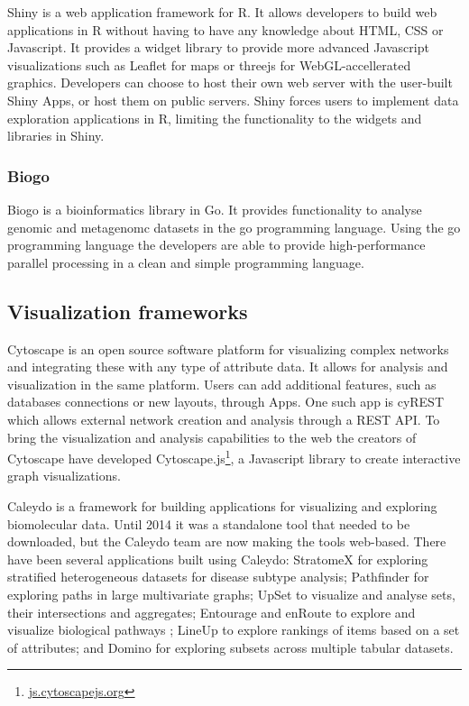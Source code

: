 Shiny is a web application framework for R.\cite{shiny} It allows developers to
build web applications in R without having to have any knowledge about HTML, CSS
or Javascript. It provides a widget library to provide more advanced Javascript
visualizations such as Leaflet for maps or threejs for WebGL-accellerated
graphics. Developers can choose to host their own web server with the user-built
Shiny Apps, or host them on public servers. Shiny forces users to implement data
exploration applications in R, limiting the functionality to the 
widgets and libraries in Shiny. 


\subsubsection*{Biogo} 
Biogo is a bioinformatics library in Go. It provides functionality to analyse
genomic and metagenomc datasets in the go programming
language.\cite{Kortschak005033} Using the go programming language the developers
are able to provide high-performance parallel processing in a clean and simple
programming language. 

\subsection*{Visualization frameworks} 
Cytoscape is an open source software platform for visualizing complex
networks and integrating these with any type of attribute
data\cite{shannon2003cytoscape}. It allows for analysis and visualization in the
same platform. Users can add additional features, such as databases connections
or new layouts, through Apps. One such app is cyREST which allows external network
creation and analysis through a REST API\cite{ono2015cyrest}.
To bring the visualization and analysis
capabilities to the web the creators of Cytoscape have developed
Cytoscape.js\footnote{\url{js.cytoscapejs.org}}, a Javascript library to create
interactive graph visualizations. 


Caleydo is a framework for building applications for visualizing and exploring
biomolecular data\cite{cleydo}. Until 2014 it was a standalone tool that needed
to be downloaded, but the Caleydo team are now making the tools web-based. There
have been several applications built using Caleydo: StratomeX for exploring
stratified heterogeneous datasets for disease subtype analysis\cite{stratomex};
Pathfinder for exploring paths in large multivariate graphs\cite{pathfinder};
UpSet to visualize and analyse sets, their intersections and
aggregates\cite{upset}; Entourage and enRoute to explore and visualize
biological pathways \cite{entourage}\cite{enroute}; LineUp to explore rankings
of items based on a set of attributes\cite{lineup}; and Domino for exploring
subsets across multiple tabular datasets\cite{domino}. 

